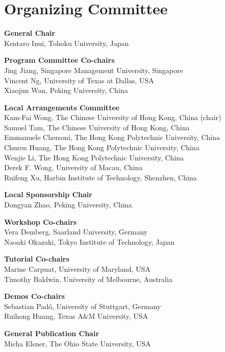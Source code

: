 \markboth{}{} %
\markright{}{} %

\section{Organizing Committee}

\setlength{\parindent}{0pt}

{\bf General Chair} \\
Kentaro Inui, Tohoku University, Japan       


{\bf Program Committee Co-chairs} \\
Jing Jiang, Singapore Management University, Singapore \\
Vincent Ng, University of Texas at Dallas, USA \\
Xiaojun Wan, Peking University, China

{\bf Local Arrangements Committee} \\
Kam-Fai Wong, The Chinese University of Hong Kong, China (chair) \\
Samuel Tam, The Chinese University of Hong Kong, China \\
Emmanuele Chersoni, The Hong Kong Polytechnic University, China \\
Churen Huang, The Hong Kong Polytechnic University, China \\
Wenjie Li, The Hong Kong Polytechnic University, China \\
Derek F. Wong, University of Macau, China \\
Ruifeng Xu, Harbin Institute of Technology, Shenzhen, China

{\bf Local Sponsorship Chair} \\
Dongyan Zhao, Peking University, China
        

{\bf Workshop Co-chairs} \\
Vera Demberg, Saarland University, Germany \\
Naoaki Okazaki, Tokyo Institute of Technology, Japan


{\bf Tutorial Co-chairs} \\
Marine Carpuat, University of Maryland, USA \\
Timothy Baldwin, University of Melbourne, Australia

{\bf Demos Co-chairs} \\
Sebastian Pad\'o, University of Stuttgart, Germany \\
Ruihong Huang, Texas A\&M University, USA
 

{\bf General Publication Chair} \\
Micha Elsner, The Ohio State University, USA


